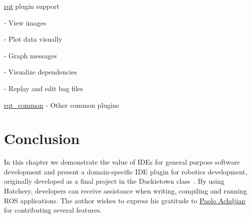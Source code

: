 \begin{multicols}{2}
\begin{todolist}
\begin{todolist}
\end{todolist}
\item \href{https://wiki.ros.org/rqt}{rqt} plugin support
\begin{todolist}
\item[\done] \href{https://wiki.ros.org/rqt_image_view}{} - View images
\item[\done] \href{https://wiki.ros.org/rqt_plot}{} - Plot data visually
\item[\done] \href{https://wiki.ros.org/rqt_graph}{} - Graph messages
\item[\done] \href{https://wiki.ros.org/rqt_dep}{} - Visualize dependencies
\item[\done] \href{https://wiki.ros.org/rqt_bag}{} - Replay and edit bag files
\item \href{https://wiki.ros.org/rqt_common_plugins}{rqt\_common} - Other common plugins
\end{todolist}
\end{todolist}
\end{multicols}

\section{Conclusion}

In this chapter we demonstrate the value of IDEs for general purpose software development and present a domain-specific IDE plugin for robotics development, originally developed as a final project in the Duckietown class~\citep{paull2017duckietown}. By using Hatchery, developers can receive assistance when writing, compiling and running ROS applications. The author wishes to express his gratitude to \href{https://github.com/paoloach}{Paolo Achdjian} for contributing several features.
